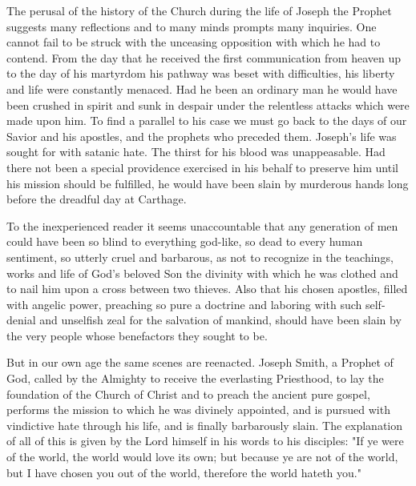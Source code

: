 The perusal of the history of the Church during the life of Joseph the Prophet suggests many
reflections and to many minds prompts many inquiries. One cannot fail to be struck with the
unceasing opposition with which he had to contend. From the day that he received the first
communication from heaven up to the day of his martyrdom his pathway was beset with
difficulties, his liberty and life were constantly menaced. Had he been an ordinary man he
would have been crushed in spirit and sunk in despair under the relentless attacks which were
made upon him. To find a parallel to his case we must go back to the days of our Savior and
his apostles, and the prophets who preceded them. Joseph's life was sought for with satanic
hate. The thirst for his blood was unappeasable. Had there not been a special providence
exercised in his behalf to preserve him until his mission should be fulfilled, he would have
been slain by murderous hands long before the dreadful day at Carthage.

To the inexperienced reader it seems unaccountable that any generation of men could have
been so blind to everything god-like, so dead to every human sentiment, so utterly cruel and
barbarous, as not to recognize in the teachings, works and life of God's beloved Son the
divinity with which he was clothed and to nail him upon a cross between two thieves. Also
that his chosen apostles, filled with angelic power, preaching so pure a doctrine and laboring
with such self-denial and unselfish zeal for the salvation of mankind, should have been slain
by the very people whose benefactors they sought to be.

But in our own age the same scenes are reenacted. Joseph Smith, a Prophet of God, called by
the Almighty to receive the everlasting Priesthood, to lay the foundation of the Church of
Christ and to preach the ancient pure gospel, performs the mission to which he was divinely
appointed, and is pursued with vindictive hate through his life, and is finally barbarously
slain. The explanation of all of this is given by the Lord himself in his words to his disciples:
"If ye were of the world, the world would love its own; but because ye are not of the world,
but I have chosen you out of the world, therefore the world hateth you."

